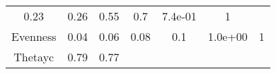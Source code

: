 \documentclass[12pt,]{article}
\begin{document}
\begin{longtable}[]{@{}ccccccc@{}}
\begin{minipage}[t]{0.16\columnwidth}
0.23\strut
\end{minipage} & \begin{minipage}[t]{0.10\columnwidth}\centering\strut
0.26\strut
\end{minipage} & \begin{minipage}[t]{0.15\columnwidth}\centering\strut
0.55\strut
\end{minipage} & \begin{minipage}[t]{0.09\columnwidth}\centering\strut
0.7\strut
\end{minipage} & \begin{minipage}[t]{0.07\columnwidth}\centering\strut
7.4e-01\strut
\end{minipage} & \begin{minipage}[t]{0.10\columnwidth}\centering\strut
1\strut
\end{minipage}\tabularnewline
\begin{minipage}[t]{0.14\columnwidth}\centering\strut
Evenness\strut
\end{minipage} & \begin{minipage}[t]{0.16\columnwidth}\centering\strut
0.04\strut
\end{minipage} & \begin{minipage}[t]{0.10\columnwidth}\centering\strut
0.06\strut
\end{minipage} & \begin{minipage}[t]{0.15\columnwidth}\centering\strut
0.08\strut
\end{minipage} & \begin{minipage}[t]{0.09\columnwidth}\centering\strut
0.1\strut
\end{minipage} & \begin{minipage}[t]{0.07\columnwidth}\centering\strut
1.0e+00\strut
\end{minipage} & \begin{minipage}[t]{0.10\columnwidth}\centering\strut
1\strut
\end{minipage}\tabularnewline
\begin{minipage}[t]{0.14\columnwidth}\centering\strut
Thetayc\strut
\end{minipage} & \begin{minipage}[t]{0.16\columnwidth}\centering\strut
0.79\strut
\end{minipage} & \begin{minipage}[t]{0.10\columnwidth}\centering\strut
0.77\strut
\end{minipage} & \begin{minipage}[t]{0.15\columnwidth}\centering\strut

\end{minipage}
\end{longtable}
\end{document}
